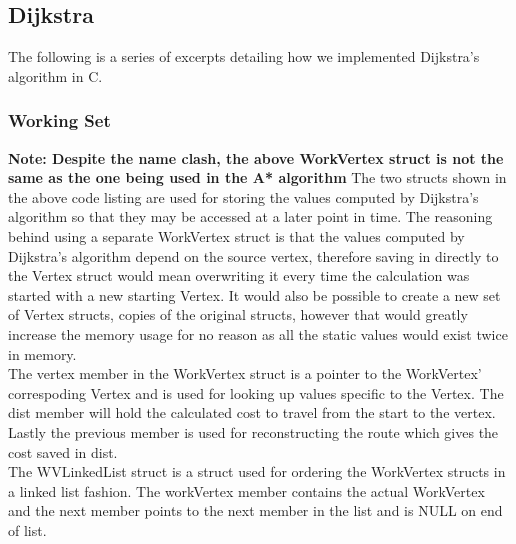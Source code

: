 \subsection{Dijkstra}

The following is a series of excerpts detailing how we implemented Dijkstra's algorithm in C.

\subsubsection{Working Set}



\textbf{Note: Despite the name clash, the above WorkVertex struct is not the same as the one being used in the A* algorithm}
The two structs shown in the above code listing are used for storing the values computed by Dijkstra's algorithm so that they may be accessed at a later point in time. The reasoning behind using a separate WorkVertex struct is that the values computed by Dijkstra's algorithm depend on the source vertex, therefore saving in directly to the Vertex struct would mean overwriting it every time the calculation was started with a new starting Vertex. It would also be possible to create a new set of Vertex structs, copies of the original structs, however that would greatly increase the memory usage for no reason as all the static values would exist twice in memory.\\
The vertex member in the WorkVertex struct is a pointer to the WorkVertex' correspoding Vertex and is used for looking up values specific to the Vertex. The dist member will hold the calculated cost to travel from the start to the vertex. Lastly the previous member is used for reconstructing the route which gives the cost saved in dist.\\
The WVLinkedList struct is a struct used for ordering the WorkVertex structs in a linked list fashion. The workVertex member contains the actual WorkVertex and the next member points to the next member in the list and is NULL on end of list.